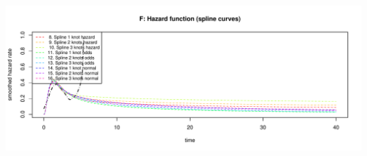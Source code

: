 \documentclass[]{article}
\begin{document}
\begin{flushleft}\includegraphics[height=0.29\textheight]{Images/validate_extrapolation3-6} \end{flushleft}

\begin{table}


\end{table}
\end{document}
